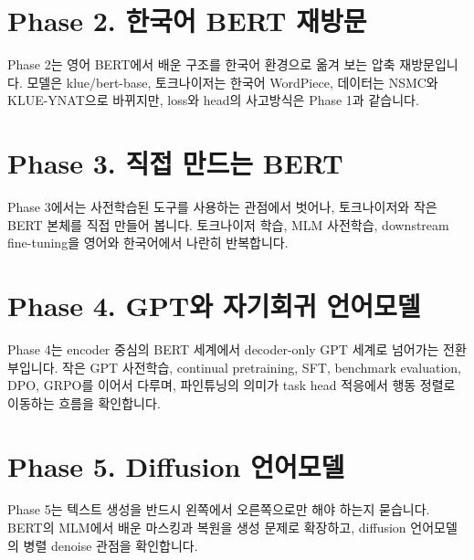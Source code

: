 \documentclass[11pt,oneside]{book}
\begin{document}
\chapter*{Phase 2. 한국어 BERT 재방문}

Phase 2는 영어 BERT에서 배운 구조를 한국어 환경으로 옮겨 보는 압축 재방문입니다. 모델은 klue/bert-base, 토크나이저는 한국어 WordPiece, 데이터는 NSMC와 KLUE-YNAT으로 바뀌지만, loss와 head의 사고방식은 Phase 1과 같습니다.






\chapter*{Phase 3. 직접 만드는 BERT}

Phase 3에서는 사전학습된 도구를 사용하는 관점에서 벗어나, 토크나이저와 작은 BERT 본체를 직접 만들어 봅니다. 토크나이저 학습, MLM 사전학습, downstream fine-tuning을 영어와 한국어에서 나란히 반복합니다.







\chapter*{Phase 4. GPT와 자기회귀 언어모델}

Phase 4는 encoder 중심의 BERT 세계에서 decoder-only GPT 세계로 넘어가는 전환부입니다. 작은 GPT 사전학습, continual pretraining, SFT, benchmark evaluation, DPO, GRPO를 이어서 다루며, 파인튜닝의 의미가 task head 적응에서 행동 정렬로 이동하는 흐름을 확인합니다.










\chapter*{Phase 5. Diffusion 언어모델}

Phase 5는 텍스트 생성을 반드시 왼쪽에서 오른쪽으로만 해야 하는지 묻습니다. BERT의 MLM에서 배운 마스킹과 복원을 생성 문제로 확장하고, diffusion 언어모델의 병렬 denoise 관점을 확인합니다.




\end{document}
